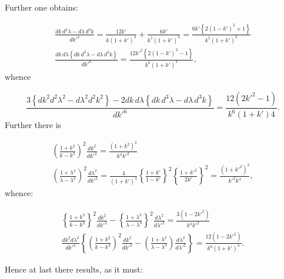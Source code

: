 \documentclass{article}
\begin{document}
Further one obtains:

\[
\begin{gathered}
\frac{dk\,d^{3}\lambda-d\lambda\,d^{3}k}{dk'^{4}}=\frac{12k'}{k(1+k')^{4}}+\frac{6k'}{k^{5}(1+k')^{2}}=\frac{6k'\left\{2(1-k')^{2}+1\right\}}{k^{5}(1+k')^{2}}\\[1.5ex]
\frac{dk\,d\lambda\left\{dk\,d^{3}\lambda-d\lambda\,d^{3}k\right\}}{dk'^{6}}=\frac{12k'^{2}\left\{2(1-k')^{2}-1\right\}}{k^{6}(1+k')^{4}},
\end{gathered}
\]
whence

\[
\frac{3\left\{dk^{2}d^{2}\lambda^{2}-d\lambda^{2}d^{2}k^{2}\right\}-2dk\,d\lambda\left\{dk\,d^{3}\lambda-d\lambda\,d^{3}k\right\}}{dk'^{6}}=\frac{12(2k'^{2}-1)}{k^{6}(1+k')4}.
\]
Further there is

\[
\begin{gathered}
\left(\frac{1+k^{2}}{k-k^{3}}\right)^{2}\frac{dk^{2}}{dk'^{2}}=\frac{(1+k^{2})^{2}}{k^{4}k'^{2}}\\[1.5ex]
\left(\frac{1+\lambda^{2}}{\lambda-\lambda^{3}}\right)^{2}\frac{d\lambda^{2}}{dk'^{2}}=\frac{4}{(1+k')^{4}}\left\{\frac{1+k'}{1-k'}\right\}^{2}\left\{\frac{1+k'^{2}}{2k'}\right\}^{2}=\frac{(1+k'^{2})^{2}}{k'^{2}k^{4}},
\end{gathered}
\]
whence:

\[
\begin{gathered}
\left\{\frac{1+k^{2}}{k-k^{3}}\right\}^{2}\frac{dk^{2}}{dk'^{2}}-\left\{\frac{1+\lambda^{2}}{\lambda-\lambda^{3}}\right\}^{2}\frac{d\lambda^{2}}{d\lambda'^{2}}=\frac{3(1-2k'^{2})}{k^{4}k'^{2}}\\[1.5ex]
\frac{dk^{2}d\lambda^{2}}{dk'^{4}}\left\{\left(\frac{1+k^{2}}{k-k^{3}}\right)^{2}\frac{dk^{2}}{dk'^{2}}-\left(\frac{1+\lambda^{2}}{\lambda-\lambda^{3}}\right)\frac{d\lambda^{2}}{d\lambda'^{2}}\right\}=\frac{12(1-2k'^{2})}{k^{6}(1+k')^{4}}.
\end{gathered}
\]

Hence at last there results, as it must:
\end{document}
